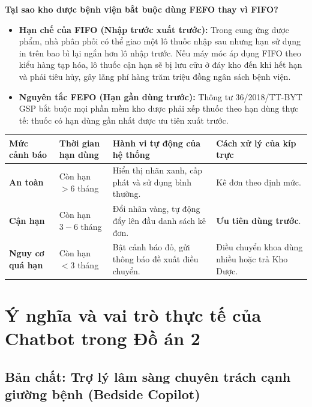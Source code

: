 \documentclass[11pt,a4paper]{article}
\begin{document}
\textbf{Tại sao kho dược bệnh viện bắt buộc dùng FEFO thay vì FIFO?}
\begin{itemize}[leftmargin=*, itemsep=0.08em, topsep=0.06em]
    \item \textbf{Hạn chế của FIFO (Nhập trước xuất trước):} Trong cung ứng dược phẩm, nhà phân phối có thể giao một lô thuốc nhập sau nhưng hạn sử dụng in trên bao bì lại ngắn hơn lô nhập trước. Nếu máy móc áp dụng FIFO theo kiểu hàng tạp hóa, lô thuốc cận hạn sẽ bị lưu cữu ở đáy kho đến khi hết hạn và phải tiêu hủy, gây lãng phí hàng trăm triệu đồng ngân sách bệnh viện.
    \item \textbf{Nguyên tắc FEFO (Hạn gần dùng trước):} Thông tư 36/2018/TT-BYT GSP bắt buộc mọi phần mềm kho dược phải xếp thuốc theo hạn dùng thực tế: thuốc có hạn dùng gần nhất được ưu tiên xuất trước.
\end{itemize}

\vspace{-0.2em}
\begin{center}
\small
\begingroup
{}
\begin{tabularx}{\textwidth}{@{}C{2.0cm}L{3.2cm}YL{2.6cm}@{}}
\toprule
\textbf{Mức cảnh báo} & \textbf{Thời gian hạn dùng} & \textbf{Hành vi tự động của hệ thống} & \textbf{Cách xử lý của kíp trực} \\
\midrule
\textbf{An toàn} & Còn hạn $> 6$ tháng & Hiển thị nhãn xanh, cấp phát và sử dụng bình thường. & Kê đơn theo định mức. \\
\textbf{Cận hạn} & Còn hạn $3 - 6$ tháng & Đổi nhãn vàng, tự động đẩy lên đầu danh sách kê đơn. & \textbf{Ưu tiên dùng trước}. \\
\textbf{Nguy cơ quá hạn} & Còn hạn $< 3$ tháng & Bật cảnh báo đỏ, gửi thông báo đề xuất điều chuyển. & Điều chuyển khoa dùng nhiều hoặc trả Kho Dược. \\
\bottomrule
\end{tabularx}
\endgroup
\end{center}

\newpage
\section{Ý nghĩa và vai trò thực tế của Chatbot trong Đồ án 2}

\subsection{Bản chất: Trợ lý lâm sàng chuyên trách cạnh giường bệnh (Bedside Copilot)}
\end{document}
